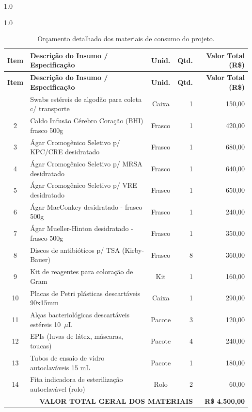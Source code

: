 \documentclass[12pt,a4paper]{article}
\begin{document}
\begin{spacing}{1.0}
\begin{spacing}{1.0}
\begin{longtable}{clcrr}
\caption{Orçamento detalhado dos materiais de consumo do projeto.}\\
\toprule
\textbf{Item} & \textbf{Descrição do Insumo / Especificação} & \textbf{Unid.} & \textbf{Qtd.} & \textbf{Valor Total (R\$)} \\
\midrule
\endfirsthead
\toprule
\textbf{Item} & \textbf{Descrição do Insumo / Especificação} & \textbf{Unid.} & \textbf{Qtd.} & \textbf{Valor Total (R\$)} \\
\midrule
\endhead
\bottomrule
\endfoot
1 & Swabs estéreis de algodão para coleta c/ transporte & Caixa & 1 & 150,00 \\
2 & Caldo Infusão Cérebro Coração (BHI) frasco 500g & Frasco & 1 & 420,00 \\
3 & Ágar Cromogênico Seletivo p/ KPC/CRE desidratado & Frasco & 1 & 680,00 \\
4 & Ágar Cromogênico Seletivo p/ MRSA desidratado & Frasco & 1 & 640,00 \\
5 & Ágar Cromogênico Seletivo p/ VRE desidratado & Frasco & 1 & 650,00 \\
6 & Ágar MacConkey desidratado - frasco 500g & Frasco & 1 & 240,00 \\
7 & Ágar Mueller-Hinton desidratado - frasco 500g & Frasco & 1 & 350,00 \\
8 & Discos de antibióticos p/ TSA (Kirby-Bauer) & Frasco & 8 & 360,00 \\
9 & Kit de reagentes para coloração de Gram & Kit & 1 & 160,00 \\
10 & Placas de Petri plásticas descartáveis 90x15mm & Caixa & 1 & 290,00 \\
11 & Alças bacteriológicas descartáveis estéreis 10~$\mu$L & Pacote & 3 & 120,00 \\
12 & EPIs (luvas de látex, máscaras, toucas) & Pacote & 4 & 240,00 \\
13 & Tubos de ensaio de vidro autoclaváveis 15 mL & Pacote & 1 & 180,00 \\
14 & Fita indicadora de esterilização autoclavável (rolo) & Rolo & 2 & 60,00 \\
\midrule
\multicolumn{4}{r}{\textbf{VALOR TOTAL GERAL DOS MATERIAIS}} & \textbf{R\$ 4.500,00} \\
\bottomrule
\end{longtable}
\end{spacing}
\newpage


\end{spacing}
\end{document}

